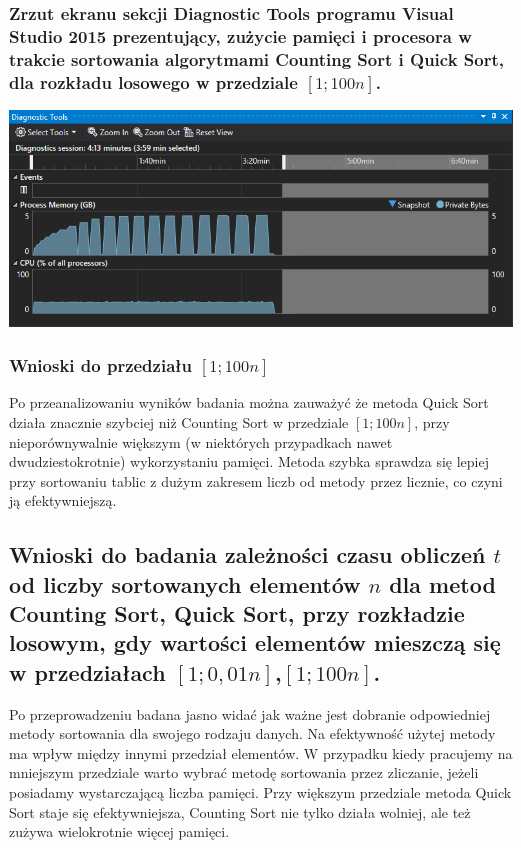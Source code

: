 \documentclass[polish,polish,a4paper]{article}
\begin{document}
\begin{spacing}{1.5}
\subsubsection*{Zrzut ekranu sekcji Diagnostic Tools programu Visual Studio 2015 prezentujący, zużycie pamięci i procesora w trakcie sortowania algorytmami Counting Sort i  Quick Sort, dla rozkładu losowego w przedziale $[1;100n]$.}

\begin{minipage}[H]{\textwidth}
	\begin{center}
		\includegraphics[scale=0.85]{zad4pamiec100n.png}
		\label{fig:zad4pamiec100n}
	\end{center}
\end{minipage}



\subsubsection{Wnioski do przedziału $[1;100n]$}

Po przeanalizowaniu wyników badania można zauważyć że metoda Quick Sort działa znacznie szybciej niż Counting Sort w przedziale $[1;100n]$, przy nieporównywalnie większym (w niektórych przypadkach nawet dwudziestokrotnie) wykorzystaniu pamięci. Metoda szybka sprawdza się lepiej przy sortowaniu tablic z dużym zakresem liczb od metody przez licznie, co czyni ją efektywniejszą.


\subsection{Wnioski do badania zależności czasu obliczeń $t$ od liczby sortowanych elementów $n$ dla metod Counting Sort, Quick Sort, przy rozkładzie losowym, gdy wartości elementów mieszczą się w przedziałach  $ [1;0,01n] $,$ [1;100n] $. }

Po przeprowadzeniu badana jasno widać jak ważne jest dobranie odpowiedniej metody sortowania dla swojego rodzaju danych. Na efektywność użytej metody ma wpływ między innymi przedział elementów. W przypadku kiedy pracujemy na mniejszym przedziale warto wybrać metodę sortowania przez zliczanie, jeżeli posiadamy wystarczającą liczba pamięci. Przy większym przedziale metoda Quick Sort staje się efektywniejsza, Counting Sort nie tylko działa wolniej, ale też zużywa wielokrotnie więcej pamięci.
	

	
\end{spacing}
	\newpage
	\tableofcontents
\end{document}
